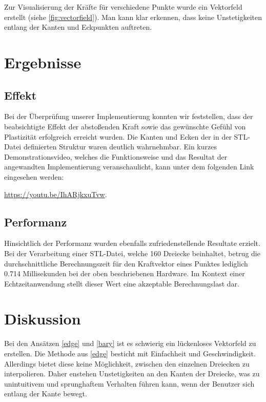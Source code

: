 \documentclass[conference]{IEEEtran}
\begin{document}
Zur Visualisierung der Kräfte für verschiedene Punkte wurde ein Vektorfeld erstellt 
(siehe \ref{fig:vectorfield}). Man kann klar erkennen, dass keine Unstetigkeiten entlang der 
Kanten und Eckpunkten auftreten.


\section{Ergebnisse}

\subsection{Effekt}
Bei der Überprüfung unserer Implementierung konnten wir feststellen, dass der beabsichtigte Effekt der 
abstoßenden Kraft sowie das gewünschte Gefühl von Plastizität erfolgreich erreicht wurden. 
Die Kanten und Ecken der in der STL-Datei definierten Struktur waren deutlich wahrnehmbar. 
Ein kurzes Demonstrationsvideo, welches die Funktionsweise und das Resultat der angewandten 
Implementierung veranschaulicht, kann unter dem folgenden Link eingesehen werden:
\begin{minipage}{\textwidth}
    \nobreak\url{https://youtu.be/IhARjkxuTvw}.
\end{minipage}

\subsection{Performanz}
Hinsichtlich der Performanz wurden ebenfalls zufriedenstellende Resultate erzielt. Bei der Verarbeitung 
einer STL-Datei, welche 160 Dreiecke beinhaltet, betrug die durchschnittliche Berechnungszeit für den 
Kraftvektor eines Punktes lediglich 0.714 Millisekunden bei der oben beschriebenen Hardware. Im Kontext 
einer Echtzeitanwendung stellt dieser Wert eine akzeptable Berechnungslast dar. 

\section{Diskussion}
Bei den Ansätzen \ref*{edge} und \ref*{bary} ist es schwierig ein lückenloses Vektorfeld zu erstellen. 
Die Methode aus \ref*{edge} besticht mit Einfachheit und Geschwindigkeit. Allerdings bietet  diese keine Möglichkeit, 
zwischen den einzelnen Dreiecken zu interpolieren. Daher enstehen Unstetigkeiten an den Kanten der Dreiecke, 
was zu unintuitivem und sprunghaftem Verhalten führen kann, wenn der Benutzer sich entlang der Kante 
bewegt.
\end{document}
